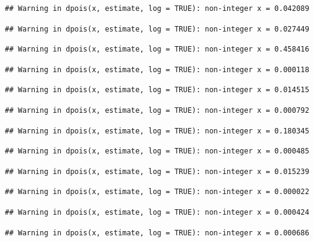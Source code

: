 \documentclass[]{article}
\begin{document}
\begin{verbatim}
## Warning in dpois(x, estimate, log = TRUE): non-integer x = 0.042089
\end{verbatim}

\begin{verbatim}
## Warning in dpois(x, estimate, log = TRUE): non-integer x = 0.027449
\end{verbatim}

\begin{verbatim}
## Warning in dpois(x, estimate, log = TRUE): non-integer x = 0.458416
\end{verbatim}

\begin{verbatim}
## Warning in dpois(x, estimate, log = TRUE): non-integer x = 0.000118
\end{verbatim}

\begin{verbatim}
## Warning in dpois(x, estimate, log = TRUE): non-integer x = 0.014515
\end{verbatim}

\begin{verbatim}
## Warning in dpois(x, estimate, log = TRUE): non-integer x = 0.000792
\end{verbatim}

\begin{verbatim}
## Warning in dpois(x, estimate, log = TRUE): non-integer x = 0.180345
\end{verbatim}

\begin{verbatim}
## Warning in dpois(x, estimate, log = TRUE): non-integer x = 0.000485
\end{verbatim}

\begin{verbatim}
## Warning in dpois(x, estimate, log = TRUE): non-integer x = 0.015239
\end{verbatim}

\begin{verbatim}
## Warning in dpois(x, estimate, log = TRUE): non-integer x = 0.000022
\end{verbatim}

\begin{verbatim}
## Warning in dpois(x, estimate, log = TRUE): non-integer x = 0.000424
\end{verbatim}

\begin{verbatim}
## Warning in dpois(x, estimate, log = TRUE): non-integer x = 0.000686
\end{verbatim}
\end{document}
